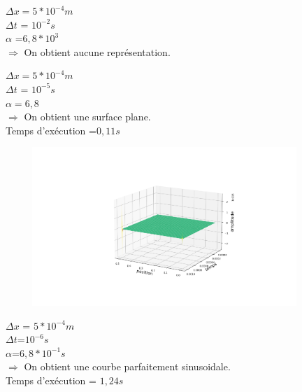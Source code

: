 \begin{enumerate}[label=\alph*)]
\begin{minipage}{.5\textwidth}%

\item $\Delta x =  5*{10}^{-4}m$\\
$\Delta t$ = ${10}^{-2} s $\\
$\alpha$ =$6,8*{10}^{3}$\\

$\Longrightarrow$ On obtient aucune représentation.

\end{minipage}


\begin{minipage}{.5\textwidth}%

\item $\Delta x = 5*{10}^{-4}m$\\
$\Delta t$ = ${10}^{-5} s $ \\
$\alpha =6,8$\\

$\Longrightarrow$ On obtient une surface plane.\\
Temps d'exécution =$0,11s$


\end{minipage}%
\hfill
\begin{minipage}{.45\textwidth}%
\includegraphics[width=12cm,height=6cm]{explicited.png}

\end{minipage}%

\begin{minipage}{.5\textwidth}%

\item $\Delta x$ = $5*{10}^{-4}m$\\
$\Delta t$=${10}^{-6} s $ \\
$\alpha$=$6,8*{10}^{-1}s$\\

$\Longrightarrow$ On obtient une courbe parfaitement sinusoidale.\\
Temps d'exécution = $1,24s$


\end{minipage}
\end{enumerate}
